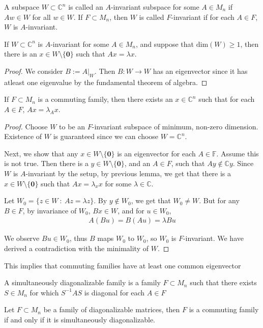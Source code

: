 \begin{definition}
  A subspace $W \subset \mathbb{C}^n$ is called an $A$-invariant
  subspace for some $A \in M_n$ if $Aw \in W$ for all $w \in W$. If
  $F \subset M_n$, then $W$ is called $F$-invariant if for each $A
  \in F$, $W$ is $A$-invariant.
\end{definition}

\begin{lemma}
  If $W \subset \mathbb{C}^n$ is $A$-invariant for some $A \in M_n$,
  and suppose that $\textrm{dim}(W) \ge 1$, then there is an $x \in W
  \setminus \{  \textbf{0} \}$ such that $Ax = \lambda x$.
\end{lemma}
\begin{proof}
  We consider $B:= A|_W$. Then $B: W \to W$ has an eigenvector since
  it has atleast one eigenvalue by the fundamental theorem of algebra.
\end{proof}

\begin{lemma}
  If $F \subset M_n$ is a commuting family, then there exists an $x
  \in \mathbb{C}^n$ such that for each $A \in F$, $Ax = \lambda_A x$.
\end{lemma}
\begin{proof}
  Choose $W$ to be an $F$-invariant subspace of minimum, non-zero
  dimension. Existence of $W$ is guaranteed since we can choose $W =
  \mathbb{C}^n$.

  Next, we show that any $ x \in W \setminus \{ \textbf{0} \}$ is an
  eigenvector for each $ A \in \mathbb{F}$. Assume this is not true.
  Then there is  a $ y\in W \setminus \{ \textbf{0} \}$, and an $ A
  \in F$, such that $Ay \not\in \mathbb{C}y$. Since $W$ is
  $A$-invariant by the setup, by previous lemma, we get that there is
  a $x \in W \setminus \{ \textbf{0} \}$ such that $Ax = \lambda_x x$
  for some $\lambda \in \mathbb{C}$.

  Let $ W_0 = \{ z \in W \ : \ Az = \lambda z \}$. By $y \notin W_0$,
  we get that $W_0 \neq W$. But for any $B \in F$, by invariance of
  $W_0$, $Bx \in W$, and for $u \in W_0$,
  \begin{align*}
    A(Bu) = B(Au) =  \lambda Bu
  \end{align*}

  We observe $Bu \in W_0$, thus $B$ maps $W_0$ to $W_0$, so $ W_0$ is
  $ F$-invariant. We have derived a contradiction with the minimality of $W$.
\end{proof}

\begin{remark}
  This implies that commuting families have at least one common eigenvector
\end{remark}

\begin{definition}
  A simultaneously diagonalizable family is a family $F \subset M_n$
  such that there exists $S \in M_n$ for which $S^{-1} A S$ is
  diagonal for each $A \in F$
\end{definition}

\begin{theorem}
  Let $F \subset M_n$ be a family of diagonalizable matrices, then
  $F$ is a commuting family if and only if it is simultaneously diagonalizable.
\end{theorem}
